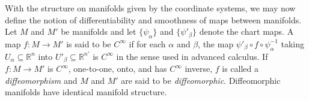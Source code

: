 With the structure on manifolds given by the coordinate systems, we may now define
the notion of differentiability and smoothness of maps between manifolds.  Let
\(M\) and \(M'\) be manifolds and let \(\{\psi_\alpha\}\) and
\(\{\psi'_\beta\}\) denote the chart maps.  A map \(f:M\to M'\) is said to be
\(C^\infty\) if for each \(\alpha\) and \(\beta\), the map
\(\psi'_\beta\circ f\circ\psi_\alpha^{-1}\) taking
\(U_\alpha\subseteq\mathbb{R}^n\) into
\(U'_\beta\subseteq\mathbb{R}^{n'}\) is \(C^\infty\) in the sense used in
advanced calculus.  If \(f:M\to M'\) is \(C^\infty\), one-to-one, onto, and has
\(C^\infty\) inverse, \(f\) is called a \emph{diffeomorphism} and \(M\) and \(M'\)
are said to be \emph{diffeomorphic}.  Diffeomorphic manifolds have identical
manifold structure.
